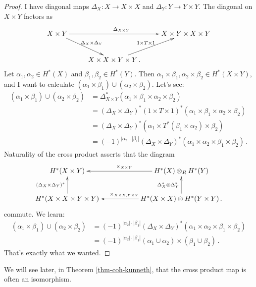 \begin{proof}
I have diagonal maps $\Delta_X:X\to X\times X$ and $\Delta_Y:Y\to Y\times Y$. 
The diagonal on $X\times Y$ factors as
\[
\xymatrix{
X\times Y \ar[rr]^{\Delta_{X\times Y}} \ar[dr]^{\Delta_X\times\Delta_Y} &&
X\times Y\times X\times Y \\
& X\times X\times Y\times Y \ar[ur]^{1\times T\times1}\,.
}\]
Let $\alpha_1,\alpha_2\in H^\ast(X)$ and $\beta_1,\beta_2\in H^\ast(Y)$. Then $\alpha_1\times \beta_1,\alpha_2\times\beta_2\in H^\ast(X\times Y)$, and I want to calculate $(\alpha_1\times\beta_1)\cup(\alpha_2\times\beta_2)$. Let's see:
\begin{align*}
(\alpha_1\times\beta_1)\cup(\alpha_2\times\beta_2) & = \Delta_{X\times Y}^\ast(\alpha_1\times\beta_1\times\alpha_2\times\beta_2)\\
& = (\Delta_X\times\Delta_Y)^\ast(1\times T\times 1)^\ast(\alpha_1\times\beta_1\times\alpha_2\times\beta_2)\\
& = (\Delta_X\times\Delta_Y)^\ast(\alpha_1\times T^\ast(\beta_1\times\alpha_2)\times\beta_2)\\
& = (-1)^{|\alpha_2|\cdot|\beta_1|}(\Delta_X\times\Delta_Y)^\ast(\alpha_1\times\alpha_2\times\beta_1\times\beta_2)\,.
\end{align*}
Naturality of the cross product asserts that the diagram
\begin{equation*}
\xymatrix{
	 H^\ast(X\times Y) && \ar[ll]_{\times_{X\times Y}} H^\ast(X)\otimes_R H^\ast(Y)\\
	 H^\ast(X\times X\times Y\times Y)\ar[u]^{(\Delta_X\times\Delta_Y)^\ast} && H^\ast(X\times X)\otimes H^\ast(Y\times Y)\ar[ll]_{\times_{X\times X,Y\times Y}}\ar[u]^{\Delta_X^\ast\otimes\Delta_Y^\ast}\,.
}
\end{equation*}
commute. We learn:
\begin{align*}
(\alpha_1\times\beta_1)\cup(\alpha_2\times\beta_2) & = (-1)^{|\alpha_2|\cdot|\beta_1|}(\Delta_X\times\Delta_Y)^\ast(\alpha_1\times\alpha_2\times\beta_1\times\beta_2)\\
& = (-1)^{|\alpha_2|\cdot|\beta_1|}(\alpha_1\cup\alpha_2)\times(\beta_1\cup\beta_2)\,.
\end{align*}
That's exactly what we wanted.
\end{proof}
We will see later, in Theorem \ref{thm-coh-kunneth}, that the cross product
map is often an isomorphism. 

